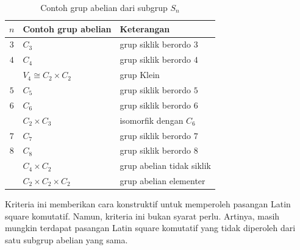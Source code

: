 \begin{table}[H]
  \centering
  \label{tab:contoh_subgrup_abelian_sn}
  \begin{tabular}{|c|l|l|}
    \hline
    $n$ & Contoh grup abelian       & Keterangan                \\
    \hline
    $3$ & $C_3$                     & grup siklik berordo $3$   \\
    \hline
    $4$ & $C_4$                     & grup siklik berordo $4$   \\
        & $V_4\cong C_2\times C_2$  & grup Klein                \\
    \hline
    $5$ & $C_5$                     & grup siklik berordo $5$   \\
    \hline
    $6$ & $C_6$                     & grup siklik berordo $6$   \\
        & $C_2\times C_3$           & isomorfik dengan $C_6$    \\
    \hline
    $7$ & $C_7$                     & grup siklik berordo $7$   \\
    \hline
    $8$ & $C_8$                     & grup siklik berordo $8$   \\
        & $C_4\times C_2$           & grup abelian tidak siklik \\
        & $C_2\times C_2\times C_2$ & grup abelian elementer    \\
    \hline
  \end{tabular}
  \caption{Contoh grup abelian dari subgrup $S_n$}
\end{table}

Kriteria ini memberikan cara konstruktif untuk memperoleh pasangan Latin
square komutatif. Namun, kriteria ini bukan syarat perlu. Artinya, masih
mungkin terdapat pasangan Latin square komutatif yang tidak diperoleh dari
satu subgrup abelian yang sama.

